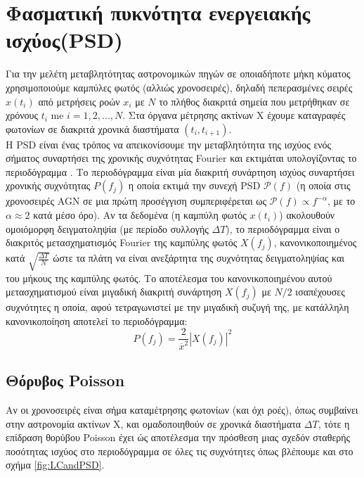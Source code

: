\section{Φασματική πυκνότητα ενεργειακής ισχύος(\textlatin{PSD})}

Για την μελέτη μεταβλητότητας αστρονομικών πηγών σε οποιαδήποτε μήκη κύματος χρησιμοποιούμε καμπύλες φωτός (αλλιώς χρονοσειρές), δηλαδή πεπερασμένες σειρές $x(t_i)$ από μετρήσεις ροών $x_i$ με $Ν$ το πλήθος διακριτά σημεία που μετρήθηκαν σε χρόνους $t_i$ me $i=1,2,...,N$. Στα όργανα μέτρησης ακτίνων Χ έχουμε καταγραφές φωτονίων σε διακριτά χρονικά διαστήματα $(t_i , t_{i+1})$\cite{Grant2019}.\\
Η \textlatin{PSD} είναι ένας τρόπος να απεικονίσουμε την μεταβλητότητα της ισχύος ενός σήματος συναρτήσει της χρονικής συχνότητας \textlatin{Fourier} και εκτιμάται υπολογίζοντας το περιοδόγραμμα \cite{Vaughan2}.
Το περιοδόγραμμα είναι μία διακριτή συνάρτηση ισχύος συναρτήσει χρονικής συχνότητας $ P (f_j)$ η οποία εκτιμά την συνεχή \textlatin{PSD} $\mathcal{P}(f)$ (η οποία στις χρονοσειρές \textlatin{AGN} σε μια πρώτη προσέγγιση συμπεριφέρεται ως $ \mathcal{P}(f) \propto f^{-\alpha}$, με το $\alpha \approx 2$ κατά μέσο όρο). Αν τα δεδομένα (η καμπύλη φωτός $x(t_i)$) ακολουθούν ομοιόμορφη δειγματοληψία (με περίοδο συλλογής $\Delta T$), το περιοδόγραμμα είναι ο διακριτός μετασχηματισμός \textlatin{Fourier} της καμπύλης φωτός $X(f_j)$, κανονικοποιημένος κατά $\sqrt{\frac{\Delta T}{N}}$ ώστε τα πλάτη να είναι ανεξάρτητα της συχνότητας δειγματοληψίας και του μήκους της καμπύλης φωτός. Το αποτέλεσμα του κανονικοποιημένου αυτού μετασχηματισμού είναι μιγαδική διακριτή συνάρτηση $X(f_j)$ με $Ν/2$ ισαπέχουσες συχνότητες η οποία, αφού τετραγωνιστεί με την μιγαδική συζυγή της, με κατάλληλη κανονικοποίηση αποτελεί το περιοδόγραμμα\cite{Vaughan2}:
\begin{equation} P(f_j) = \frac{2}{\overline{x}^2} |X(f_j)|^2  \end{equation}

\subsection{Θόρυβος \textlatin{Poisson}}
Αν οι χρονοσειρές είναι σήμα καταμέτρησης φωτονίων (και όχι ροές), όπως συμβαίνει στην αστρονομία ακτίνων Χ, και ομαδοποιηθούν σε χρονικά διαστήματα $\Delta T$, τότε η επίδραση θορύβου \textlatin{Poisson} έχει ώς αποτέλεσμα την πρόσθεση μιας σχεδόν σταθερής ποσότητας ισχύος στο περιοδόγραμμα σε όλες τις συχνότητες \cite{2003MNRAS.345.1271V} όπως βλέπουμε και στο σχήμα \ref{fig:LCandPSD}.


